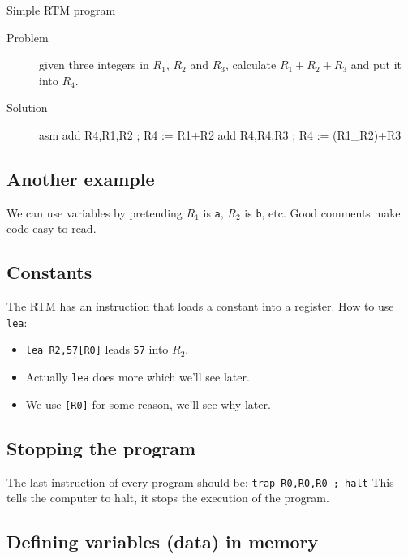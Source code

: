 \begin{highlight}{Simple RTM program}
    \begin{description}
        \item[Problem] given three integers in \(R_1\), \(R_2\) and \(R_3\), calculate  \(R_1+R_2+R_3\) and put it into \(R_4\).
        \item[Solution]

            \begin{code}{asm}
                add R4,R1,R2 ; R4 := R1+R2
                add R4,R4,R3 ; R4 := (R1_R2)+R3
            \end{code}
    \end{description}
\end{highlight}

\subsection{Another example}\label{sub:another_example}

We can use variables by pretending \(R_1\) is  \texttt{a}, \(R_2\) is \texttt{b}, etc.
Good comments make code easy to read.

\subsection{Constants}\label{sub:constants}

The RTM has an instruction that loads a constant into a register.
How to use \texttt{lea}:
\begin{itemize}
    \item \texttt{lea R2,57[R0]} leads \texttt{57} into \(R_2\).
    \item Actually \texttt{lea} does more which we'll see later.
    \item We use \texttt{[R0]} for some reason, we'll see why later.
\end{itemize}

\subsection{Stopping the program}\label{sub:stopping_the_program}

The last instruction of every program should be: \texttt{trap R0,R0,R0 ; halt}
This tells the computer to halt, it stops the execution of the program.

\subsection{Defining variables (data) in memory}\label{sub:defining_variables_data_in_memory}

